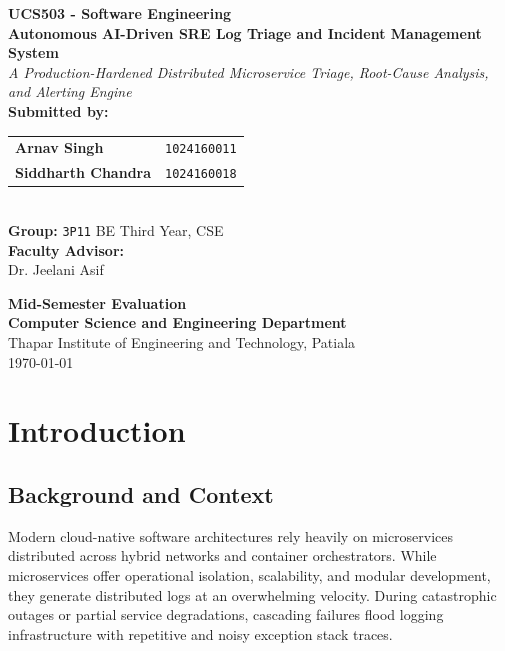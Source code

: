\documentclass[12pt,a4paper]{report}
\begin{document}
\begin{titlepage}
    \centering
    \vspace*{0.5cm}
    
    {\large \textbf{UCS503 - Software Engineering}}\\[1.5cm]
    
    {\LARGE \textbf{Autonomous AI-Driven SRE Log Triage and Incident Management System}}\\[0.5cm]
    {\large \textit{A Production-Hardened Distributed Microservice Triage, Root-Cause Analysis, and Alerting Engine}}\\[2cm]
    
    \textbf{Submitted by:}\\[0.3cm]
    \begin{tabular}{ll}
        \textbf{Arnav Singh} & \texttt{1024160011} \\
        \textbf{Siddharth Chandra} & \texttt{1024160018} \\
    \end{tabular}\\[1.5cm]
    
    \textbf{Group:} \texttt{3P11} BE Third Year, CSE\\[1.5cm]
    
    \textbf{Faculty Advisor:}\\
    Dr. Jeelani Asif\\[2cm]
    
    \vfill
    
    {\large \textbf{Mid-Semester Evaluation}}\\[0.2cm]
    {\bfseries Computer Science and Engineering Department}\\[0.15cm]
    Thapar Institute of Engineering and Technology, Patiala\\[0.5cm]
    \today
\end{titlepage}

\tableofcontents
\newpage

\chapter{Introduction}

\section{Background and Context}
Modern cloud-native software architectures rely heavily on microservices distributed across hybrid networks and container orchestrators. While microservices offer operational isolation, scalability, and modular development, they generate distributed logs at an overwhelming velocity. During catastrophic outages or partial service degradations, cascading failures flood logging infrastructure with repetitive and noisy exception stack traces.
\end{document}

